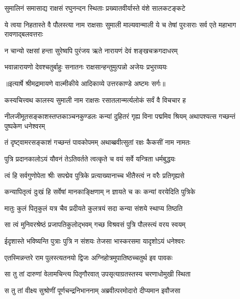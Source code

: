 \twolineshloka
{सुमालिनं समासाद्य राक्षसं रघुनन्दन}
{स्थिताः प्रख्यातवीर्यास्ते वंशे सालकटङ्कटे} %

\threelineshloka
{ये त्वया निहतास्ते वै पौलस्त्या नाम राक्षसाः}
{सुमाली माल्यवान्माली ये च तेषां पुरःसराः}
{सर्व एते महाभाग रावणाद्बलवत्तराः} %

\twolineshloka
{न चान्यो रक्षसां हन्ता सुरेष्वपि पुरंजय}
{ऋते नारायणं देवं शङ्खचक्रगदाधरम्} %

\twolineshloka
{भवान्नारायणो देवश्चतुर्बाहुः सनातनः}
{राक्षसान्हन्तुमुत्पन्नो अजेयः प्रभुरव्ययः} %


{॥इत्यार्षे श्रीमद्रामायणे वाल्मीकीये आदिकाव्ये उत्तरकाण्डे अष्टमः सर्गः॥}


\twolineshloka
{कस्यचित्त्वथ कालस्य सुमाली नाम राक्षसः}
{रसातलान्मर्त्यलोकं सर्वं वै विचचार ह} %

\threelineshloka
{नीलजीमूतसङ्काशस्तप्तकाञ्चनकुण्डलः}
{कन्यां दुहितरं गृह्य विना पद्ममिव श्रियम्}
{अथापश्यत्स गच्छन्तं पुष्पकेण धनेश्वरम्} %

\twolineshloka
{तं दृष्ट्वामरसङ्काशं गच्छन्तं पावकोपमम्}
{अथाब्ब्रवीत्सुतां रक्षः कैकसीं नाम नामतः} %

\twolineshloka
{पुत्रि प्रदानकालोऽयं यौवनं तेऽतिवर्तते}
{त्वत्कृते च वयं सर्वे यन्त्रिता धर्मबुद्धयः} %

\twolineshloka
{त्वं हि सर्वगुणोपेता श्रीः सपद्मेव पुत्रिके}
{प्रत्याख्यानाच्च भीतैस्त्वं न वरैः प्रतिगृह्यसे} %

\twolineshloka
{कन्यापितृत्वं दुःखं हि सर्वेषां मानकाङ्क्षिणाम्}
{न ज्ञायते च कः कन्यां वरयेदिति पुत्रिके} %

\twolineshloka
{मातुः कुलं पितृकुलं यत्र चैव प्रदीयते}
{कुलत्रयं सदा कन्या संशये स्थाप्य तिष्ठति} %

\twolineshloka
{सा त्वं मुनिवरश्रेष्ठं प्रजापतिकुलोद्भवम्}
{गच्छ विश्रवसं पुत्रि पौलस्त्यं वरय स्वयम्} %

\twolineshloka
{ईदृशास्ते भविष्यन्ति पुत्राः पुत्रि न संशयः}
{तेजसा भास्करसमा यादृशोऽयं धनेश्वरः} %

\twolineshloka
{एतस्मिन्नन्तरे राम पुलस्त्यतनयो द्विजः}
{अग्निहोत्रमुपातिष्ठच्चतुर्थ इव पावकः} %

\twolineshloka
{सा तु तां दारुणां वेलामचिन्त्य पितृगौरवात्}
{उपसृत्याग्रतस्तस्य चरणाधोमुखी स्थिता} %

\twolineshloka
{स तु तां वीक्ष्य सुश्रोणीं पूर्णचन्द्रनिभाननाम्}
{अब्रवीत्परमोदारो दीप्यमान इवौजसा} %

